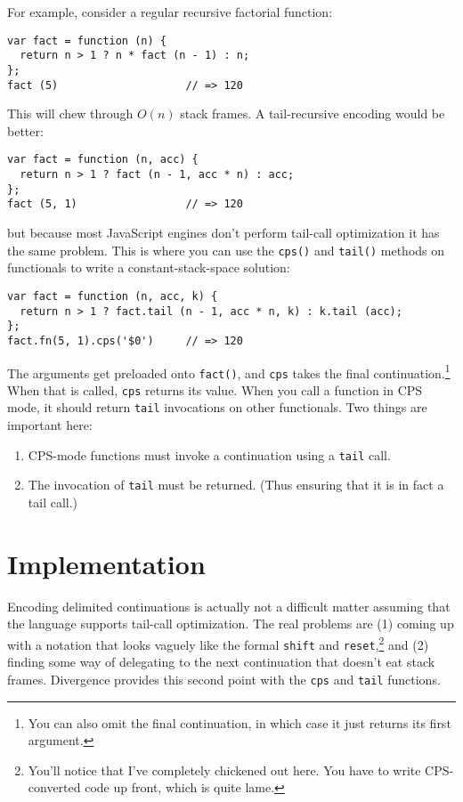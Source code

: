 \documentclass{report}
\begin{document}
    For example, consider a regular recursive factorial function:

\begin{verbatim}
var fact = function (n) {
  return n > 1 ? n * fact (n - 1) : n;
};
fact (5)                    // => 120
\end{verbatim}

    This will chew through $O(n)$ stack frames. A tail-recursive encoding would be better:

\begin{verbatim}
var fact = function (n, acc) {
  return n > 1 ? fact (n - 1, acc * n) : acc;
};
fact (5, 1)                 // => 120
\end{verbatim}

    \noindent but because most JavaScript engines don't perform tail-call optimization it has the same problem. This is where you can use the \verb|cps()| and \verb|tail()| methods on
    functionals to write a constant-stack-space solution:

\begin{verbatim}
var fact = function (n, acc, k) {
  return n > 1 ? fact.tail (n - 1, acc * n, k) : k.tail (acc);
};
fact.fn(5, 1).cps('$0')     // => 120
\end{verbatim}

    The arguments get preloaded onto \verb|fact()|, and \verb|cps| takes the final continuation.\footnote{You can also omit the final continuation, in which case it just returns its first
    argument.} When that is called, \verb|cps| returns its value. When you call a function in CPS mode, it should return \verb|tail| invocations on other functionals. Two things are important
    here:

\begin{enumerate}
\item CPS-mode functions must invoke a continuation using a \verb|tail| call.
\item The invocation of \verb|tail| must be returned. (Thus ensuring that it is in fact a tail call.)
\end{enumerate}

\section {Implementation}
      Encoding delimited continuations is actually not a difficult matter assuming that the language supports tail-call optimization. The real problems are (1) coming up with a notation that
      looks vaguely like the formal \verb|shift| and \verb|reset|,\footnote{You'll notice that I've completely chickened out here. You have to write CPS-converted code up front, which is quite
      lame.} and (2) finding some way of delegating to the next continuation that doesn't eat stack frames. Divergence provides this second point with the \verb|cps| and \verb|tail| functions.
\end{document}
